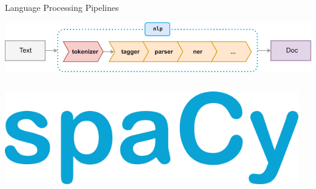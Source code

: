 \documentclass[10pt]{beamer}
\begin{document}
\begin{frame}{Language Processing Pipelines}

\begin{center}
  \includegraphics[width=1.0\textwidth]{figures/spacy-pipeline.png}
  \\ \vspace{2em}
  \begin{columns}
    \begin{column}{0.3\textwidth}
      \begin{center}
        \includegraphics[scale=0.18]{figures/spacy-logo.png}
      \end{center}
    \end{column}
    \begin{column}{0.7\textwidth}
    \end{column}
  \end{columns}
\end{center}

\end{frame}
\end{document}

